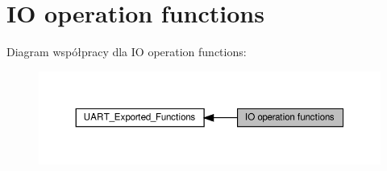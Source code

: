 \hypertarget{group___u_a_r_t___exported___functions___group2}{}\section{IO operation functions}
\label{group___u_a_r_t___exported___functions___group2}
Diagram współpracy dla IO operation functions\+:\nopagebreak
\begin{figure}[H]
\begin{center}
\leavevmode
\includegraphics[width=350pt]{group___u_a_r_t___exported___functions___group2}
\end{center}
\end{figure}
